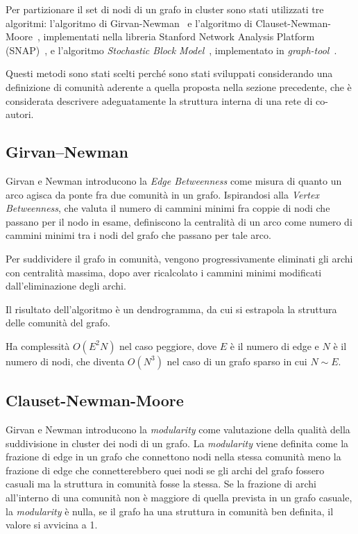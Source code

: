 \documentclass[12pt,a4paper,twoside]{report}
\begin{document}
Per partizionare il set di nodi di un grafo in cluster sono stati utilizzati tre algoritmi:
l'algoritmo di Girvan-Newman~\cite{Girvan7821} e l'algoritmo di
Clauset-Newman-Moore~\cite{2004PhRvE..70f6111C}, implementati nella libreria Stanford Network
Analysis Platform (SNAP)~\cite{snapnets}, e l'algoritmo \textit{Stochastic Block
Model}~\cite{2014PhRvE..89a2804P}, implementato in
\textit{graph-tool}~\cite{peixoto_graph-tool_2014}.

Questi metodi sono stati scelti perché sono stati sviluppati considerando una definizione di
comunità aderente a quella proposta nella sezione precedente, che è considerata descrivere
adeguatamente la struttura interna di una rete di co-autori.

\subsection{Girvan–Newman} \label{subsec:gn}
Girvan e Newman introducono la \textit{Edge Betweenness} come misura di quanto un arco agisca da
ponte fra due comunità in un grafo. Ispirandosi alla \textit{Vertex Betweenness}, che valuta il
numero di cammini minimi fra coppie di nodi che passano per il nodo in esame, definiscono la
centralità di un arco come numero di cammini minimi tra i nodi del grafo che passano per tale arco.

Per suddividere il grafo in comunità, vengono progressivamente eliminati gli archi con centralità
massima, dopo aver ricalcolato i cammini minimi modificati dall'eliminazione degli archi.

Il risultato dell'algoritmo è un dendrogramma, da cui si estrapola la struttura delle comunità del
grafo.

Ha complessità $O(E^2N)$ nel caso peggiore, dove $E$ è il numero di edge e $N$ è il numero di nodi,
che diventa $O(N^3)$ nel caso di un grafo sparso in cui $N\sim E$.

\subsection{Clauset-Newman-Moore} \label{subsec:cnm}

Girvan e Newman introducono la \textit{modularity} \cite{2004phrve..69b6113n} come valutazione della
qualità della suddivisione in cluster dei nodi di un grafo. La \textit{modularity} viene definita
come la frazione di edge in un grafo che connettono nodi nella stessa comunità meno la frazione di
edge che connetterebbero quei nodi se gli archi del grafo fossero casuali ma la struttura in
comunità fosse la stessa. Se la frazione di archi all'interno di una comunità non è maggiore di
quella prevista in un grafo casuale, la \textit{modularity} è nulla, se il grafo ha una struttura in
comunità ben definita, il valore si avvicina a 1.
\end{document}
